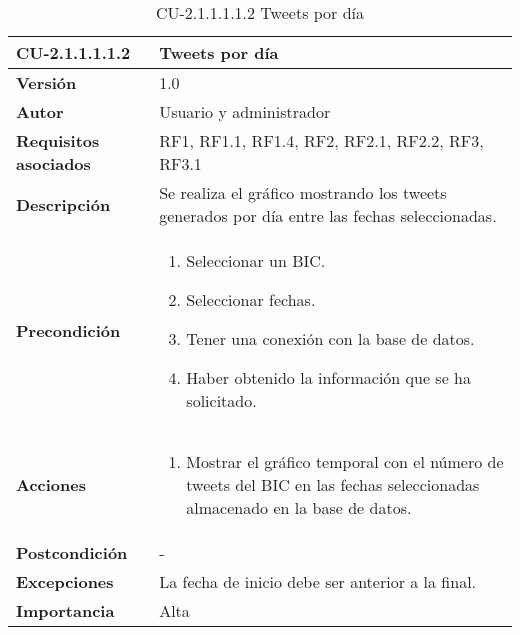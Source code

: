 \begin{table}[h!]
	\centering
	\begin{tabularx}{\linewidth}{ p{} p{} }
		\toprule
		\textbf{CU-2.1.1.1.1.2}    & \textbf{Tweets por día}\\
		\toprule
		\textbf{Versión}              & 1.0    \\
		\textbf{Autor}                & Usuario y administrador \\
		\textbf{Requisitos asociados} & RF1, RF1.1, RF1.4, RF2, RF2.1, RF2.2, RF3, RF3.1\\
		\textbf{Descripción}          & Se realiza el gráfico mostrando los tweets generados por día entre las fechas seleccionadas.  \\
        \textbf{Precondición}         & 
        \begin{enumerate}
			\def\labelenumi{\arabic{enumi}.}
			\tightlist
                \item Seleccionar un BIC.
                \item Seleccionar fechas. 
			\item Tener una conexión con la base de datos.
                \item Haber obtenido la información que se ha solicitado.
            
		\end{enumerate}\\
		
		\textbf{Acciones}             &
		\begin{enumerate}
			\def\labelenumi{\arabic{enumi}.}
			\tightlist
			\item Mostrar el gráfico temporal con el número de tweets del BIC en las fechas seleccionadas almacenado en la base de datos.
            
		\end{enumerate}\\
		\textbf{Postcondición}        &  - \\
		\textbf{Excepciones}          &  La fecha de inicio debe ser anterior a la final.\\
		\textbf{Importancia}          & Alta \\
		\bottomrule
	\end{tabularx}
	\caption{CU-2.1.1.1.1.2 Tweets por día}
\end{table}

